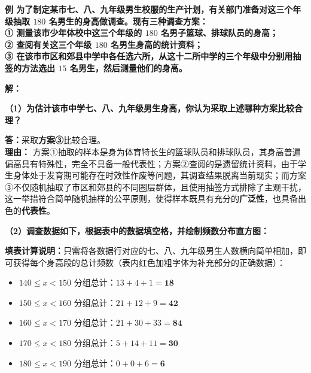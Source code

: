 \textbf{例 为了制定某市七、八、九年级男生校服的生产计划，有关部门准备对这三个年级抽取 $180$ 名男生的身高做调查。现有三种调查方案：\\
① 测量该市少年体校中这三个年级的 $180$ 名男子篮球、排球队员的身高；\\
② 查阅有关这三个年级 $180$ 名男生身高的统计资料；\\
③ 在该市市区和郊县中学中各任选六所，从这十二所中学的三个年级中分别用抽签的方法选出 $15$ 名男生，然后测量他们的身高。}

\vspace{0.4cm}

\textbf{解：}

\textbf{（1）为估计该市中学七、八、九年级男生身高，你认为采取上述哪种方案比较合理？}

\vspace{0.2cm}
\textbf{答：}采取\textbf{方案③}比较合理。\\
\textbf{理由：} 方案①抽取的样本是身为体育特长生的篮球队员和排球队员，其身高普遍偏高具有特殊性，完全不具备一般代表性；方案②查阅的是遗留统计资料，由于学生身体处于发育期可能存在时效性作废等问题，其调查结果脱离当前现实；而方案③不仅随机抽取了市区和郊县的不同圈层群体，且使用抽签方式排除了主观干扰，这一举措符合简单随机抽样的公平原则，使得样本既具有充分的\textbf{广泛性}，也具备出色的\textbf{代表性}。

\vspace{0.6cm}

\textbf{（2）调查数据如下，根据表中的数据填空格，并绘制频数分布直方图：}

\vspace{0.2cm}
\textbf{填表计算说明：}只需将各数据行对应的七、八、九年级男生人数横向简单相加，即可获得每个身高段的总计频数（表内红色加粗字体为补充部分的正确数据）：
\begin{itemize}
  \item $140 \leqslant x < 150$ 分组总计：$13 + 4 + 1 = \boldsymbol{18}$
  \item $150 \leqslant x < 160$ 分组总计：$21 + 12 + 9 = \boldsymbol{42}$
  \item $160 \leqslant x < 170$ 分组总计：$21 + 30 + 33 = \boldsymbol{84}$
  \item $170 \leqslant x < 180$ 分组总计：$5 + 14 + 11 = \boldsymbol{30}$
  \item $180 \leqslant x < 190$ 分组总计：$0 + 0 + 6 = \boldsymbol{6}$
\end{itemize}

